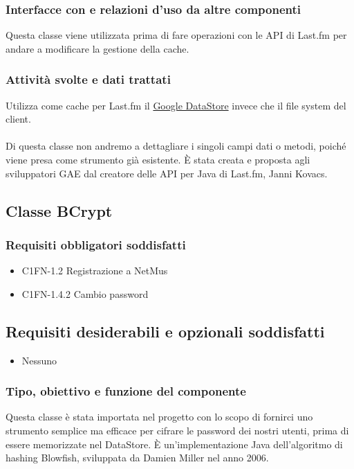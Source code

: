 \subsubsection*{Interfacce con e relazioni d'uso da altre componenti}
Questa classe viene utilizzata prima di fare operazioni con le API di Last.fm
per andare a modificare la gestione della cache.
\subsubsection*{Attivit\`a svolte e dati trattati}
Utilizza come cache per Last.fm il \underline{Google DataStore} invece che il
file system del client.
\\\\
Di questa classe non andremo a dettagliare i singoli campi dati o metodi,
poich\'e viene presa come strumento gi\`a esistente. \`E stata creata e proposta agli
sviluppatori GAE dal creatore delle API per Java di Last.fm, Janni Kovacs.

\subsection{Classe BCrypt}
\subsubsection*{Requisiti obbligatori soddisfatti}
\begin{itemize}
    \item C1FN-1.2 Registrazione a NetMus
    \item C1FN-1.4.2 Cambio password
\end{itemize}
\subsection*{Requisiti desiderabili e opzionali soddisfatti}
\begin{itemize}
    \item Nessuno
\end{itemize}
\subsubsection*{Tipo, obiettivo e funzione del componente}
Questa classe \`e stata importata nel progetto con lo scopo di fornirci uno
strumento semplice ma efficace per cifrare le password dei nostri utenti, prima
di essere memorizzate nel DataStore. \`E un'implementazione Java dell'algoritmo
di hashing Blowfish, sviluppata da Damien Miller nel anno 2006.
